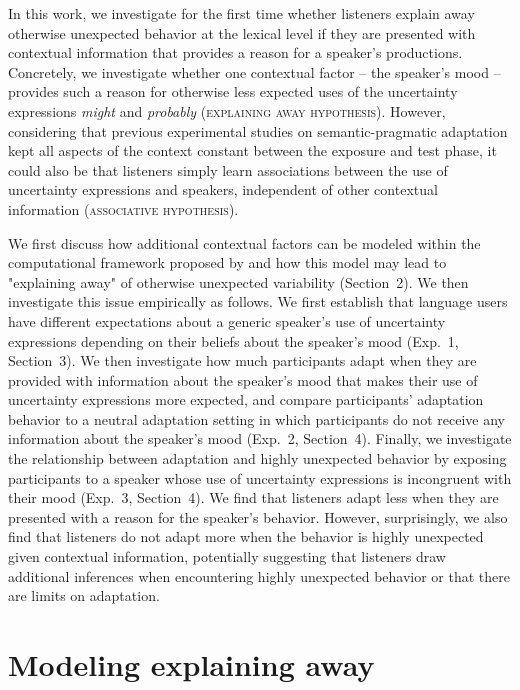 \documentclass[man,floatsintext]{apa6}
\begin{document}
In this work, we investigate for the first time whether listeners explain away otherwise unexpected behavior at the lexical level if they are presented with contextual information that provides a reason for a speaker's productions. Concretely, we investigate whether one contextual factor  -- the speaker's mood -- provides such a reason for otherwise less expected uses of the uncertainty expressions \textit{might} and \textit{probably}  (\textsc{explaining away hypothesis}). However, considering that previous experimental studies on semantic-pragmatic adaptation \cite{Yildirim2016,Schuster2020} kept all aspects of the context constant between the exposure and test phase, it could also be that listeners simply learn associations between the use of uncertainty expressions and speakers, independent of other contextual information (\textsc{associative hypothesis}).

We first discuss how additional contextual factors can be modeled within the computational framework proposed by  and how this model may lead to "explaining away" \cite{Pearl1988} of otherwise unexpected variability (Section~2).  We then investigate this issue empirically as follows. We first establish that language users have different expectations about a generic speaker's use of uncertainty expressions depending on their beliefs about the speaker's mood (Exp.~1, Section~3). We then investigate how much participants adapt when they are provided with information about the speaker's mood that makes their use of uncertainty expressions more expected, and compare participants' adaptation behavior to a neutral adaptation setting in which participants do not receive any information about the speaker's mood (Exp.~2, Section~4). Finally, we investigate the relationship between adaptation and highly unexpected behavior by exposing participants to a speaker whose use of uncertainty expressions is incongruent with their mood (Exp.~3, Section~4). We find that listeners adapt less when they are presented with a reason for the speaker's behavior. However, surprisingly, we also find that listeners do not adapt more when the behavior is highly unexpected given contextual information, potentially suggesting that listeners draw additional inferences when encountering highly unexpected behavior or that there are limits on adaptation.

\section{Modeling explaining away}
\label{sec:model}
\end{document}
